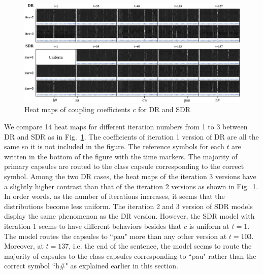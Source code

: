 \documentclass[review]{elsarticle}
\begin{document}
\begin{figure}[ht!]
  \includegraphics[trim={0 0cm 0 0cm}, clip, width=1.0 \linewidth]{06_coupling_coefficient_maps.jpg}
  \caption{Heat maps of coupling coefficients $c$ for DR and SDR}
  \label{fig:ccm}
\end{figure}
We compare 14 heat maps for different iteration numbers from 1 to 3 between DR and SDR as in Fig.~\ref{fig:ccm}.
The coefficients of iteration 1 version of DR are all the same so it is not included in the figure.
The reference symbols for each $t$ are written in the bottom of the figure with the time markers.
The majority of primary capsules are routed to the class capsule corresponding to the correct symbol.
Among the two DR cases, the heat maps of the iteration 3 versions have a slightly higher contrast than that of the iteration 2 versions as shown in Fig.~\ref{fig:ccm}.
In order words, as the number of iterations increases, it seems that the distributions become less uniform.
The iteration 2 and 3 version of SDR models display the same phenomenon as the DR version.
However, the SDR model with iteration 1 seems to have different behaviors besides that $c$ is uniform at $t=1$.
The model routes the capsules to ``pau" more than any other version at $t=103$.
Moreover, at $t=137$, i.e. the end of the sentence, the model seems to route the majority of capsules to the class capsules corresponding to ``pau" rather than the correct symbol ``h\#" as explained earlier in this section.
\end{document}
